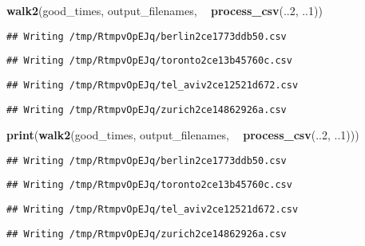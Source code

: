 \documentclass[]{book}
\newenvironment{Shaded}{\begin{snugshade}}{\end{snugshade}}
\newcommand{\DecValTok}[1]{\textcolor[rgb]{0.00,0.00,0.81}{#1}}
\newcommand{\KeywordTok}[1]{\textcolor[rgb]{0.13,0.29,0.53}{\textbf{#1}}}
\newcommand{\NormalTok}[1]{#1}
\newcommand{\OperatorTok}[1]{\textcolor[rgb]{0.81,0.36,0.00}{\textbf{#1}}}
\newcommand{\StringTok}[1]{\textcolor[rgb]{0.31,0.60,0.02}{#1}}
\begin{document}
\begin{Shaded}
\begin{Highlighting}[]
\KeywordTok{walk2}\NormalTok{(good_times, output_filenames, }\OperatorTok{~}\StringTok{ }\KeywordTok{process_csv}\NormalTok{(..}\DecValTok{2}\NormalTok{, ..}\DecValTok{1}\NormalTok{))}
\end{Highlighting}
\end{Shaded}

\begin{verbatim}
## Writing /tmp/RtmpvOpEJq/berlin2ce1773ddb50.csv
\end{verbatim}

\begin{verbatim}
## Writing /tmp/RtmpvOpEJq/toronto2ce13b45760c.csv
\end{verbatim}

\begin{verbatim}
## Writing /tmp/RtmpvOpEJq/tel_aviv2ce12521d672.csv
\end{verbatim}

\begin{verbatim}
## Writing /tmp/RtmpvOpEJq/zurich2ce14862926a.csv
\end{verbatim}

\begin{Shaded}
\begin{Highlighting}[]
\KeywordTok{print}\NormalTok{(}\KeywordTok{walk2}\NormalTok{(good_times, output_filenames, }\OperatorTok{~}\StringTok{ }\KeywordTok{process_csv}\NormalTok{(..}\DecValTok{2}\NormalTok{, ..}\DecValTok{1}\NormalTok{)))}
\end{Highlighting}
\end{Shaded}

\begin{verbatim}
## Writing /tmp/RtmpvOpEJq/berlin2ce1773ddb50.csv
\end{verbatim}

\begin{verbatim}
## Writing /tmp/RtmpvOpEJq/toronto2ce13b45760c.csv
\end{verbatim}

\begin{verbatim}
## Writing /tmp/RtmpvOpEJq/tel_aviv2ce12521d672.csv
\end{verbatim}

\begin{verbatim}
## Writing /tmp/RtmpvOpEJq/zurich2ce14862926a.csv
\end{verbatim}
\end{document}
